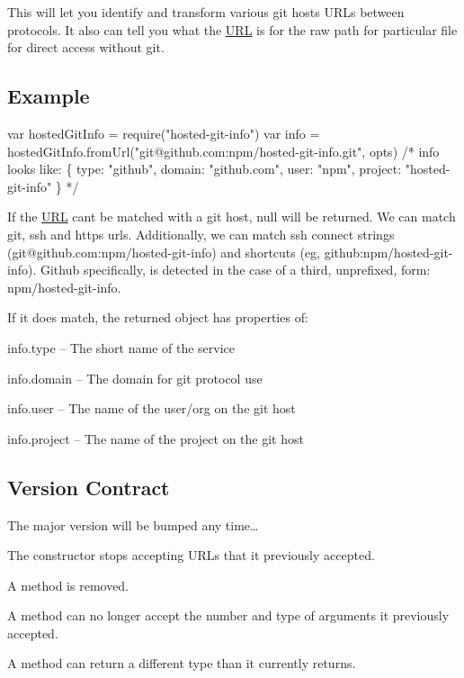 This will let you identify and transform various git hosts U\+R\+Ls between protocols. It also can tell you what the \mbox{\hyperlink{namespace_u_r_l}{U\+RL}} is for the raw path for particular file for direct access without git.

\subsection*{Example}


\begin{DoxyCode}
var hostedGitInfo = require("hosted-git-info")
var info = hostedGitInfo.fromUrl("git@github.com:npm/hosted-git-info.git", opts)
/* info looks like:
\{
  type: "github",
  domain: "github.com",
  user: "npm",
  project: "hosted-git-info"
\}
*/
\end{DoxyCode}


If the \mbox{\hyperlink{namespace_u_r_l}{U\+RL}} can\textquotesingle{}t be matched with a git host, {\ttfamily null} will be returned. We can match git, ssh and https urls. Additionally, we can match ssh connect strings ({\ttfamily git@github.\+com\+:npm/hosted-\/git-\/info}) and shortcuts (eg, {\ttfamily github\+:npm/hosted-\/git-\/info}). Github specifically, is detected in the case of a third, unprefixed, form\+: {\ttfamily npm/hosted-\/git-\/info}.

If it does match, the returned object has properties of\+:


\begin{DoxyItemize}
\item info.\+type -- The short name of the service
\item info.\+domain -- The domain for git protocol use
\item info.\+user -- The name of the user/org on the git host
\item info.\+project -- The name of the project on the git host
\end{DoxyItemize}

\subsection*{Version Contract}

The major version will be bumped any time…


\begin{DoxyItemize}
\item The constructor stops accepting U\+R\+Ls that it previously accepted.
\item A method is removed.
\item A method can no longer accept the number and type of arguments it previously accepted.
\item A method can return a different type than it currently returns.
\end{DoxyItemize}

